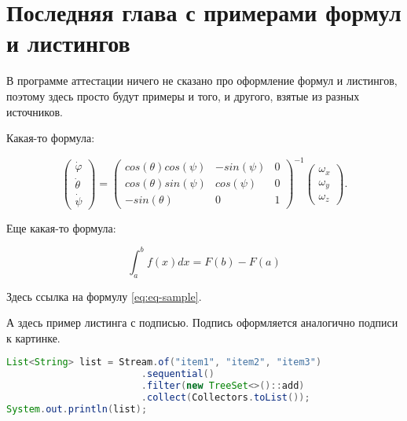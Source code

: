 \chapter{Последняя глава с примерами формул и листингов}

В программе аттестации \cite{prog} ничего не сказано про оформление формул и листингов, поэтому здесь просто будут примеры и того, и другого, взятые из разных источников.

Какая-то формула:

\begin{equation}
\begin{pmatrix} 
	\dot{\varphi}\\ \dot{\theta} \\ \dot{\psi} 
\end{pmatrix} =
\begin{pmatrix}
	cos(\theta)cos(\psi) & -sin(\psi) & 0 \\
	cos(\theta)sin(\psi) & cos(\psi)  & 0 \\
	-sin(\theta)         & 0         &  1
\end{pmatrix}^{-1}
\begin{pmatrix}
	\omega_x\\ \omega_y \\ \omega_z
\end{pmatrix}.
\end{equation}

Еще какая-то формула:

\begin{equation}
\int_{a}^{b} f(x)dx = F(b) - F(a)
\label{eq:eq-sample}
\end{equation}

Здесь ссылка на формулу \ref{eq:eq-sample}.

А здесь пример листинга с подписью. Подпись оформляется аналогично подписи к картинке.

\begin{lstlisting}[language=Java,caption=Пример листинга]
List<String> list = Stream.of("item1", "item2", "item3")
						.sequential()
						.filter(new TreeSet<>()::add)
						.collect(Collectors.toList());
System.out.println(list);
\end{lstlisting}